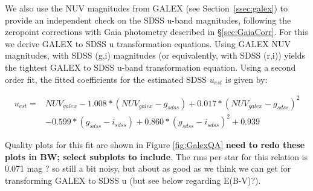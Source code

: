 We also use the NUV magnitudes from GALEX (see Section~\ref{ssec:galex}) to provide an independent check on the SDSS u-band magnitudes, following the zeropoint corrections with Gaia photometry described in \S \ref{sec:GaiaCorr}. For this we derive 
GALEX to SDSS u transformation equations. Using GALEX NUV magnitudes, with SDSS (g,i) magnitudes (or equivalently, with SDSS (r,i)) yields the tightest GALEX to SDSS u-band transformation equation. Using a second order fit, the fitted coefficients for the estimated SDSS $u_{est}$ is given by:

\begin{equation}
\begin{split}
u_{est}  = & NUV_{galex}  - 1.008*(NUV_{galex} - g_{sdss}) + 0.017*(NUV_{galex}  - g_{sdss})^2  \\
    & -0.599*(g_{sdss} - i_{sdss}) + 0.860*(g_{sdss} - i_{sdss})^2 + 0.939
\end{split}
\end{equation}
 




 
Quality plots for this fit are shown in Figure \ref{fig:GalexQA} {\bf need to redo these plots in BW; select subplots to include}. The rms per star for this relation is 0.071 mag ? so still a bit noisy, but about as good as we think we can get for transforming GALEX to SDSS u (but see below regarding E(B-V)?).
 
